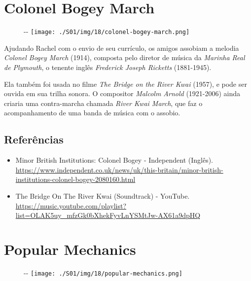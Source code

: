 \hypertarget{colonel-bogey-march}{%
\section{Colonel Bogey March}\label{colonel-bogey-march}}

\begin{figure}[!ht]
  \begin{adjustwidth}{-\oddsidemargin-1in}{-\rightmargin}
    \centering
    \texttt{[image: ./S01/img/18/colonel-bogey-march.png]}
  \end{adjustwidth}
\end{figure}

Ajudando Rachel com o envio de seu currículo, os amigos assobiam a
melodia \emph{Colonel Bogey March} (1914), composta pelo diretor de
música da \emph{Marinha Real de Plymouth}, o tenente inglês
\emph{Frederick Joseph Ricketts} (1881-1945).

Ela também foi usada no filme \emph{The Bridge on the River Kwai}
(1957), e pode ser ouvida em sua trilha sonora. O compositor
\emph{Malcolm Arnold} (1921-2006) ainda criaria uma contra-marcha
chamada \emph{River Kwai March}, que faz o acompanhamento de uma banda
de música com o assobio.

\hypertarget{referuxeancias}{%
\subsection{Referências}\label{referuxeancias}}

\begin{itemize}
\tightlist
\item
  \sloppy Minor British Institutions: Colonel Bogey - Independent (Inglês). \url{https://www.independent.co.uk/news/uk/this-britain/minor-british-institutions-colonel-bogey-2080160.html}
\item
  \sloppy The Bridge On The River Kwai (Soundtrack) - YouTube. \url{https://music.youtube.com/playlist?list=OLAK5uy_mfzGk0bXhekFyvLnYSMtJw-AX61a9dpHQ}
\end{itemize}

\hypertarget{popular-mechanics}{%
\section{Popular Mechanics}\label{popular-mechanics}}

\begin{figure}[!ht]
  \begin{adjustwidth}{-\oddsidemargin-1in}{-\rightmargin}
    \centering
    \texttt{[image: ./S01/img/18/popular-mechanics.png]}
  \end{adjustwidth}
\end{figure}

